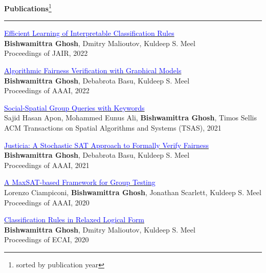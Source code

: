\documentclass[a4paper,10pt,final]{article}
\newcommand{\Sep}{\vspace{1.5em}}
\newcommand{\SmallSep}{\vspace{0.5em}}
\newcommand{\blue}[1]{\textcolor{blue}{#1}}
\begin{document}
\Sep
\Large { \textbf{Publications}}\footnote{sorted by publication year}\\
\noindent\rule{\textwidth}{1pt}
\normalsize


	

	
	
\SmallSep

	\begin{etaremune}
		\item \href{https://arxiv.org/pdf/2205.06936.pdf}{\blue{Efficient Learning of Interpretable Classification Rules}} \\
		\textbf{Bishwamittra Ghosh}, Dmitry Malioutov, Kuldeep S. Meel\\
		Proceedings of JAIR, 2022
		
		\item \href{https://arxiv.org/pdf/2109.09447.pdf}{\blue{Algorithmic Fairness Verification with Graphical Models}} \\
		\textbf{Bishwamittra Ghosh}, Debabrota Basu, Kuldeep S. Meel\\
		Proceedings of AAAI, 2022
		
		\item 	\href{https://dl.acm.org/doi/full/10.1145/3475962?accessTab=true}{\blue{Social-Spatial Group Queries with Keywords}}\\
		Sajid Hasan Apon, Mohammed Eunus Ali, \textbf{Bishwamittra Ghosh}, Timos Sellis\\
		ACM Transactions on Spatial Algorithms and Systems (TSAS), 2021
		
		\item \href{https://arxiv.org/pdf/2009.06516.pdf}{\blue{Justicia: A Stochastic SAT Approach to Formally Verify Fairness}} \\
		\textbf{Bishwamittra Ghosh}, Debabrota Basu, Kuldeep S. Meel\\
		Proceedings of AAAI, 2021
		
		\item 	\href{https://bishwamittra.github.io/publication/aaai_2020/AAAI-CiampiconiL.690.pdf}{\blue{A MaxSAT-based Framework for Group Testing}} \\
		Lorenzo Ciampiconi, \textbf{Bishwamittra Ghosh}, Jonathan Scarlett, Kuldeep S. Meel\\
		Proceedings of AAAI, 2020
		
		\item \href{https://bishwamittra.github.io/publication/ecai_2020/paper.pdf}{\blue{Classification Rules in Relaxed Logical Form
		}} \\
		\textbf{Bishwamittra Ghosh}, Dmitry Malioutov, Kuldeep S. Meel\\
		Proceedings of ECAI, 2020
		

\end{etaremune}
\end{document}

